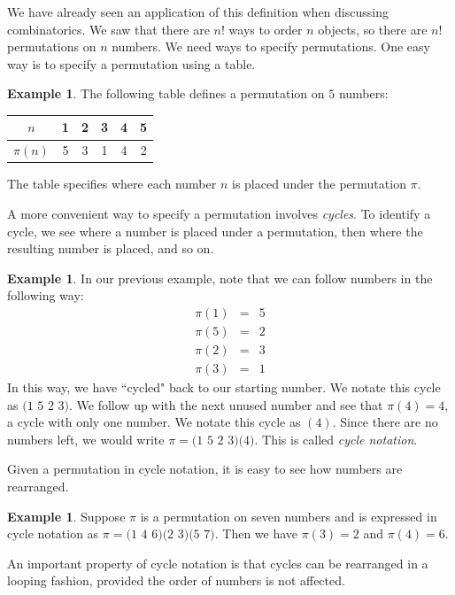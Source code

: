 \documentclass{book}
\theoremstyle{plain}
\theoremstyle{definition}
\newtheorem{example}[theorem]{Example}
\begin{document}
We have already seen an application of this definition when discussing combinatorics. We saw that there are $n!$ ways to order $n$ objects, so there are $n!$ permutations on $n$ numbers. We need ways to specify permutations. One easy way is to specify a permutation using a table.

\begin{example}
The following table defines a permutation on $5$ numbers:
\begin{center}
\begin{tabular}{|c|ccccc|}
\hline
$n$ & 1 & 2 & 3 & 4 & 5 \\
\hline
$\pi(n)$ & 5 & 3 & 1 & 4 & 2 \\
\hline
\end{tabular}
\end{center}
The table specifies where each number $n$ is placed under the permutation $\pi$.
\end{example}

A more convenient way to specify a permutation involves {\it cycles}. To identify a cycle, we see where a number is placed under a permutation, then where the resulting number is placed, and so on.

\begin{example}
In our previous example, note that we can follow numbers in the following way:
\begin{eqnarray*}
\pi(1) &=& 5 \\
\pi(5) &=& 2 \\
\pi(2) &=& 3 \\
\pi(3) &=& 1
\end{eqnarray*}
In this way, we have ``cycled" back to our starting number. We notate this cycle as $\text{(1 5 2 3)}$. We follow up with the next unused number and see that $\pi(4) = 4$, a cycle with only one number. We notate this cycle as $(4)$. Since there are no numbers left, we would write $\pi = \text{(1 5 2 3)(4)}$. This is called {\it cycle notation}.
\end{example}

Given a permutation in cycle notation, it is easy to see how numbers are rearranged.

\begin{example}
Suppose $\pi$ is a permutation on seven numbers and is expressed in cycle notation as $\pi = \text{(1 4 6)(2 3)(5 7)}$. Then we have $\pi(3) = 2$ and $\pi(4) = 6$.
\end{example}

An important property of cycle notation is that cycles can be rearranged in a looping fashion, provided the order of numbers is not affected.
\end{document}
